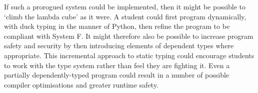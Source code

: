 \documentclass[12pt, a4paper]{report}
\begin{document}
If such a prorogued system could be implemented, then it might be possible to `climb the lambda
cube' as it were. A student could first program dynamically, with duck typing in the manner of
Python, then refine the program to be compliant with System F. It might therefore also be possible
to increase program safety and security by then introducing elements of dependent types where
appropriate. This incremental approach to static typing could encourage students to work with the
type system rather than feel they are fighting it. Even a partially dependently-typed program could
result in a number of possible compiler optimisations and greater runtime safety.


\nocite{adams2012layout}
\nocite{Appel:1997:MCI:248430}
\nocite{groote}
\nocite{Harper:2012:PFP:2431407}
\nocite{torc}
\nocite{spj1}
\nocite{spj2}
\nocite{plp}

{}

\end{document}
